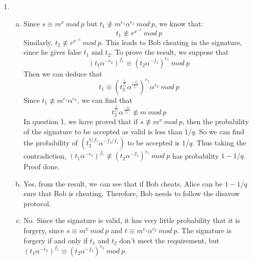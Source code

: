 \documentclass[12pt, a4paper]{article}
\begin{document}
\begin{enumerate}
    \item \begin{enumerate}[a)]
        \item Since $s \equiv m^x\ mod\ p$ but $t_1 \not\equiv m^{e_1}\alpha^{e_2}\ mod\ p$, we know that:
              $$t_1 \not\equiv r^{x^{-1}}\ mod\ p$$
              Similarly, $t_2 \not\equiv r^{x^{-1}}\ mod\ p$. 
              This leads to Bob cheating in the signature, since he gives false $t_1$ and $t_2$. 
              To prove the result, we suppose that
              $$(t_1\alpha^{-e_2})^{f_1} \equiv (t_2\alpha^{-f_2})^{e_1}\ mod\ p$$
              Then we can deduce that 
              $$t_1 \equiv (t_2^{\frac{1}{f_1}}\alpha^{\frac{-f_2}{f_1}})^{e_1}\alpha^{e_2}\ mod\ p$$
              Since $t_1 \not\equiv m^{e_1}\alpha^{e_2}$, we can find that
              $$t_2^{\frac{1}{f_1}}\alpha^{\frac{-f_2}{f_1}} \not\equiv m\ mod\ p$$
              In question 1, we have proved that if $s \not\equiv m^x\ mod\ p$, 
              then the probability of the signature to be accepted as valid is less than $1/q$. 
              So we can find the probability of $(t_2^{1/f_1}\alpha^{-f_2/f_1})$ to be accepted is $1/q$. 
              Thus taking the contradiction, 
              $(t_1\alpha^{-e_2})^{f_1} \not\equiv (t_2\alpha^{-f_2})^{e_1}\ mod\ p$ has probability $1 - 1/q$. 
              Proof done.
        \item Yes, from the result, we can see that if Bob cheats, Alice can be $1 - 1/q$ sure that Bob is cheating. 
              Therefore, Bob needs to follow the disavow protocol.
        \item No. Since the signature is valid, it has very little probability that it is forgery, 
              since $s \equiv m^x\ mod\ p$ and $t \equiv m^{e_1}\alpha^{e_2}\ mod\ p$. 
              The signature is forgery if and only if $t_1$ and $t_2$ don't meet the requirement, 
              but $(t_1\alpha^{-e_2})^{f_1} \equiv (t_2\alpha^{-f_2})^{e_1}\ mod\ p$.

    \end{enumerate}

\end{enumerate}
\end{document}
